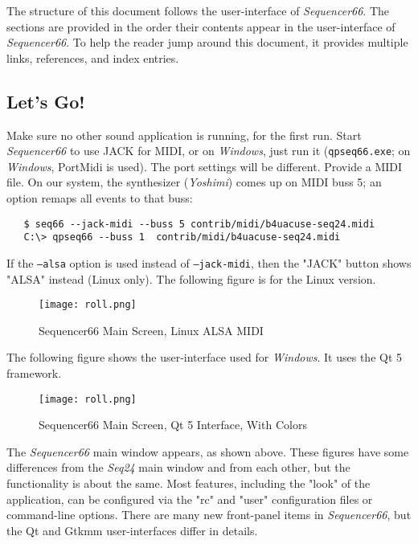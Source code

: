 \documentclass[
 11pt,
 twoside,
 a4paper,
 headinclude,
 footinclude,
 final                                 %
]{article}
\begin{document}
   The structure of this document follows the user-interface of
   \textsl{Sequencer66}.  The sections are provided in the order
   their contents appear in the user-interface of \textsl{Sequencer66}.  To
   help the reader jump around this document, it provides
   multiple links, references, and index entries.

\subsection{Let's Go!}
\label{subsec:introduction_lets_get_started}

   Make sure no other sound application is running, for the first run.
   Start \textsl{Sequencer66} to use JACK for MIDI, or
   on \textsl{Windows}, just run it (\texttt{qpseq66.exe};
   on \textsl{Windows}, PortMidi is used). The port
   settings will be different.  Provide a MIDI file.
   On our system, the synthesizer
   (\textsl{Yoshimi}) comes up on MIDI buss 5; an option remaps
   all events to that buss:

\begin{verbatim}
   $ seq66 --jack-midi --buss 5 contrib/midi/b4uacuse-seq24.midi
   C:\> qpseq66 --buss 1  contrib/midi/b4uacuse-seq24.midi
\end{verbatim}

   If the \texttt{--alsa} option is used instead of
   \texttt{--jack-midi}, then the "JACK" button shows "ALSA" instead
   (Linux only).  The following figure is for the Linux
   version.

\begin{figure}[H]
   \centering 
   \texttt{[image: roll.png]}
   \caption{Sequencer66 Main Screen, Linux ALSA MIDI}
   \label{fig:seq66_main_screen}
\end{figure}

   The following figure shows the user-interface used for
   \textsl{Windows}.  It uses the Qt 5 framework.

\begin{figure}[H]
   \centering 
   \texttt{[image: roll.png]}
   \caption{Sequencer66 Main Screen, Qt 5 Interface, With Colors}
   \label{fig:seq66_main_screen_qt}
\end{figure}

   The \textsl{Sequencer66} main window appears, as shown above.
   These figures have some differences from the \textsl{Seq24} main window
   and from each other, but the functionality is about the same.
   Most features, including the "look" of the application,
   can be configured via the "rc" and "user"
   configuration files or command-line options.
   There are many new front-panel items in \textsl{Sequencer66}, but
   the Qt and Gtkmm user-interfaces differ in details.
\end{document}
